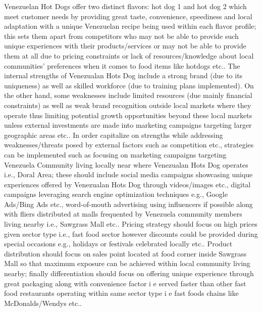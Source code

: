 Venezuelan Hot Dogs offer two distinct flavors: hot dog 1 and hot dog 2 which meet customer needs by providing great taste, convenience, speediness and local adaptation with a unique Venezuelan recipe being used within each flavor profile; this sets them apart from competitors who may not be able to provide such unique experiences with their products/services or may not be able to provide them at all due to pricing constraints or lack of resources/knowledge about local communities’ preferences when it comes to food items like hotdogs etc.. The internal strengths of Venezualan Hots Dog include a strong brand (due to its uniqueness) as well as skilled workforce (due to training plans implemented). On the other hand, some weaknesses include limited resources (due mainly financial constraints) as well as weak brand recognition outside local markets where they operate thus limiting potential growth opportunities beyond these local markets unless external investments are made into marketing campaigns targeting larger geographic areas etc..  
In order capitalize on strengths while addressing weaknesses/threats posed by external factors such as competition etc., strategies can be implemented such as focusing on marketing campaigns targeting Venezuela Community living locally near where Venezualan Hots Dog operates i.e., Doral Area; these should include social media campaigns showcasing unique experiences offered by Venezualan Hots Dog through videos/images etc., digital campaigns leveraging search engine optimization techniques e.g., Google Ads/Bing Ads etc., word-of-mouth advertising using influencers if possible along with fliers distributed at malls frequented by Venezuela community members living nearby i.e., Sawgrass Mall etc.. Pricing strategy should focus on high prices given sector type i.e., fast food sector however discounts could be provided during special occasions e.g., holidays or festivals celebrated locally etc.. Product distribution should focus on sales point located at food corner inside Sawgrass Mall so that maximum exposure can be achieved within local community living nearby; finally differentiation should focus on offering unique experience through great packaging along with convenience factor i e served faster than other fast food restaurants operating within same sector type i e fast foods chains like McDonalds/Wendys etc..  
